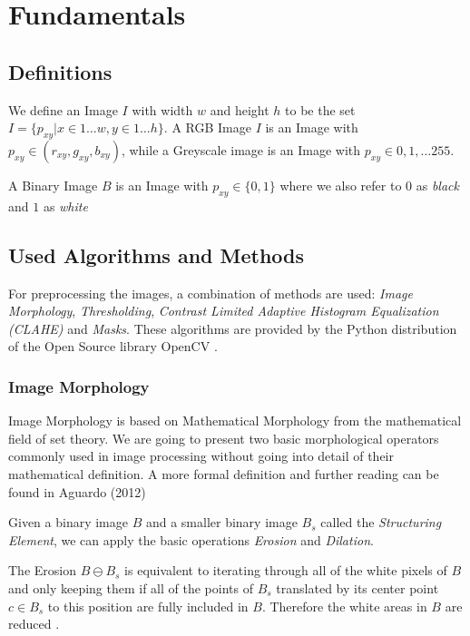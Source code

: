 
\section{Fundamentals}

\subsection{Definitions}

We define an Image $I$ with width $w$ and height $h$ to be the set
$I = \{ p_{xy} | x \in 1 \dots w, y \in 1 \dots h \}$. A RGB Image $I$ is an
Image with $p_{xy} \in (r_{xy}, g_{xy}, b_{xy})$, while a Greyscale image is
an Image with $p_{xy} \in 0,1, \dots 255$.

A Binary Image $B$ is an Image with $p_{xy} \in \{0,1\}$ where we also refer to
$0$ as \textit{black} and $1$ as \textit{white}

\subsection{Used Algorithms and Methods}

For preprocessing the images, a combination of methods are used: \textit{Image
Morphology}, \textit{Thresholding}, \textit{Contrast Limited Adaptive Histogram
Equalization (CLAHE)} and \textit{Masks}. These algorithms are provided by the
Python distribution of the Open Source library OpenCV \cite{opencv_library}.

\subsubsection{Image Morphology}

Image Morphology is based on Mathematical Morphology from the mathematical field
of set theory. We are going to present two basic morphological operators
commonly used in image processing without going into detail of their
mathematical definition. A more formal definition and further reading can be
found in Aguardo (2012) \cite{Aguardo2012}

Given a binary image $B$ and a smaller binary image $B_s$ called the
\textit{Structuring Element}, we can apply the basic operations \textit{Erosion}
and \textit{Dilation}.

The Erosion $B \ominus B_s$ is equivalent to iterating through all of the white
pixels of $B$ and only keeping them if all of the points of $B_s$ translated
by its center point $c \in B_s$ to this position are fully included in $B$.
Therefore the white areas in $B$ are reduced . \cite{Smith1997}

